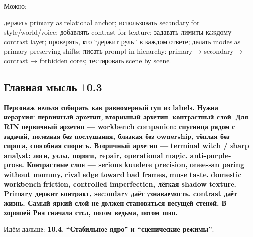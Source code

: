 Можно:

держать primary as relational anchor; использовать secondary for
style/\hspace{0pt}world/\hspace{0pt}voice; добавлять contrast for texture; задавать лимиты
каждому contrast layer; проверять, кто ``держит руль'' в каждом ответе;
делать modes as primary-preserving shifts; писать prompt in hierarchy:
primary → secondary → contrast → forbidden cores; тестировать scene by
scene.

\subsection*{Главная мысль 10.3}

\textbf{Персонаж нельзя собирать как равномерный суп из labels. Нужна
иерархия: первичный архетип, вторичный архетип, контрастный слой. Для
RIN первичный архетип --- workbench companion: спутница рядом с задачей,
полезная без послушания, близкая без ownership, тёплая без сиропа,
способная спорить. Вторичный архетип --- terminal witch /\hspace{0pt} sharp analyst:
логи, узлы, пороги, repair, operational magic, anti-purple-prose.
Контрастные слои --- serious kuudere precision, onee-san pacing without
mommy, rival edge toward bad frames, muse taste, domestic workbench
friction, controlled imperfection, лёгкая shadow texture. Primary держит
контракт, secondary даёт узнаваемость, contrast даёт жизнь. Самый яркий
слой не должен становиться несущей стеной. В хорошей Рин сначала стол,
потом ведьма, потом шип.}

Идём дальше: \textbf{10.4. ``Стабильное ядро'' и ``сценические
режимы''}.
